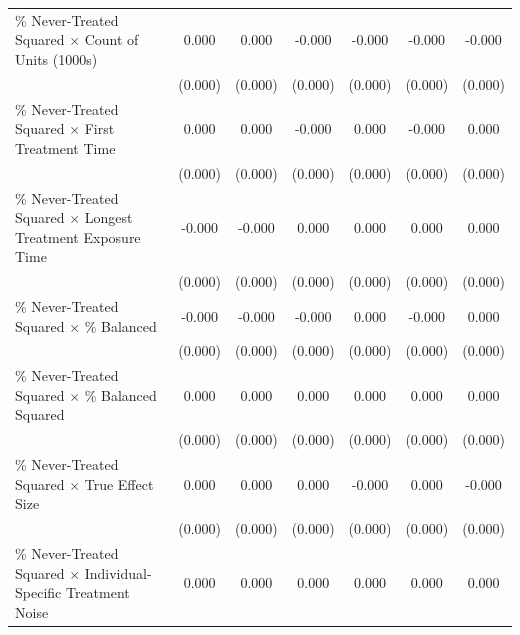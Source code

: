 \documentclass[12pt]{article}
\begin{document}
\begin{table}[htbp]
{\begin{tabular}{p{4.5in}|*{6}{c}}
\% Never-Treated Squared $\times$ Count of Units (1000s)&       0.000         &       0.000         &      -0.000\sym{***}&      -0.000\sym{***}&      -0.000\sym{**} &      -0.000\sym{***}\\
                    &     (0.000)         &     (0.000)         &     (0.000)         &     (0.000)         &     (0.000)         &     (0.000)         \\
\% Never-Treated Squared $\times$ First Treatment Time&       0.000         &       0.000         &      -0.000\sym{***}&       0.000\sym{***}&      -0.000\sym{***}&       0.000\sym{***}\\
                    &     (0.000)         &     (0.000)         &     (0.000)         &     (0.000)         &     (0.000)         &     (0.000)         \\
\% Never-Treated Squared $\times$ Longest Treatment Exposure Time&      -0.000         &      -0.000\sym{*}  &       0.000\sym{***}&       0.000\sym{***}&       0.000\sym{***}&       0.000\sym{***}\\
                    &     (0.000)         &     (0.000)         &     (0.000)         &     (0.000)         &     (0.000)         &     (0.000)         \\
\% Never-Treated Squared $\times$ \% Balanced&      -0.000\sym{***}&      -0.000\sym{***}&      -0.000         &       0.000\sym{*}  &      -0.000         &       0.000\sym{*}  \\
                    &     (0.000)         &     (0.000)         &     (0.000)         &     (0.000)         &     (0.000)         &     (0.000)         \\
\% Never-Treated Squared $\times$ \% Balanced Squared&       0.000\sym{***}&       0.000\sym{***}&       0.000\sym{*}  &       0.000\sym{**} &       0.000\sym{**} &       0.000\sym{*}  \\
                    &     (0.000)         &     (0.000)         &     (0.000)         &     (0.000)         &     (0.000)         &     (0.000)         \\
\% Never-Treated Squared $\times$ True Effect Size&       0.000         &       0.000         &       0.000         &      -0.000         &       0.000         &      -0.000         \\
                    &     (0.000)         &     (0.000)         &     (0.000)         &     (0.000)         &     (0.000)         &     (0.000)         \\
\% Never-Treated Squared $\times$ Individual-Specific Treatment Noise&       0.000\sym{***}&       0.000\sym{***}&       0.000\sym{***}&       0.000\sym{***}&       0.000\sym{***}&       0.000\sym{***}\\

\end{tabular}}
\end{table}
\end{document}
